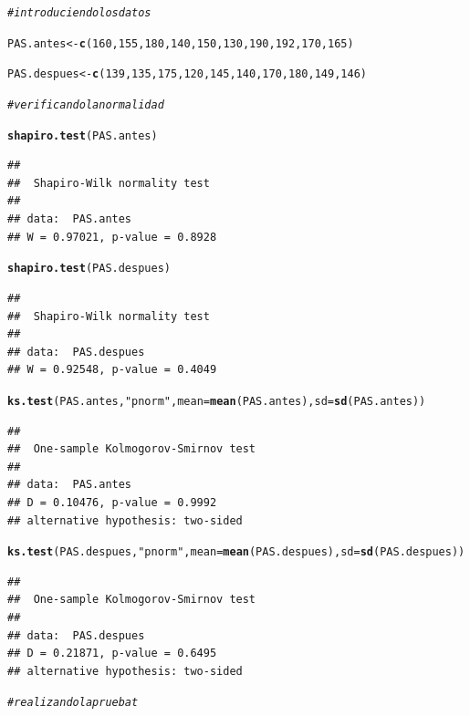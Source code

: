 \documentclass[12pt,letterpaper]{article}\usepackage[]{graphicx}\usepackage[]{color}
\makeatletter
\newcommand{\hlnum}[1]{\textcolor[rgb]{0.686,0.059,0.569}{#1}}%
\newcommand{\hlstr}[1]{\textcolor[rgb]{0.192,0.494,0.8}{#1}}%
\newcommand{\hlcom}[1]{\textcolor[rgb]{0.678,0.584,0.686}{\textit{#1}}}%
\newcommand{\hlstd}[1]{\textcolor[rgb]{0.345,0.345,0.345}{#1}}%
\newcommand{\hlkwb}[1]{\textcolor[rgb]{0.69,0.353,0.396}{#1}}%
\newcommand{\hlkwc}[1]{\textcolor[rgb]{0.333,0.667,0.333}{#1}}%
\newcommand{\hlkwd}[1]{\textcolor[rgb]{0.737,0.353,0.396}{\textbf{#1}}}%
\newenvironment{kframe}{%
 \def\at@end@of@kframe{}%
 \ifinner\ifhmode%
  \def\at@end@of@kframe{\end{minipage}}%
  \begin{minipage}{\columnwidth}%
 \fi\fi%
 \def\FrameCommand##1{\hskip\@totalleftmargin \hskip-\fboxsep
 \colorbox{shadecolor}{##1}\hskip-\fboxsep
     \hskip-\linewidth \hskip-\@totalleftmargin \hskip\columnwidth}%
 \MakeFramed {\advance\hsize-\width
   \@totalleftmargin\z@ \linewidth\hsize
   \@setminipage}}%
 {\par\unskip\endMakeFramed%
 \at@end@of@kframe}
\newenvironment{knitrout}{}{} %
\makeatother
\begin{document}
\begin{knitrout}
\color{fgcolor}\begin{kframe}
\begin{alltt}
\hlcom{#introduciendo los datos }

\hlstd{PAS.antes} \hlkwb{<-} \hlkwd{c}\hlstd{(}\hlnum{160}\hlstd{,} \hlnum{155}\hlstd{,} \hlnum{180}\hlstd{,} \hlnum{140}\hlstd{,} \hlnum{150}\hlstd{,} \hlnum{130}\hlstd{,} \hlnum{190}\hlstd{,} \hlnum{192}\hlstd{,} \hlnum{170}\hlstd{,} \hlnum{165}\hlstd{)}

\hlstd{PAS.despues} \hlkwb{<-} \hlkwd{c}\hlstd{(}\hlnum{139}\hlstd{,} \hlnum{135}\hlstd{,} \hlnum{175}\hlstd{,} \hlnum{120}\hlstd{,} \hlnum{145}\hlstd{,} \hlnum{140}\hlstd{,} \hlnum{170}\hlstd{,} \hlnum{180}\hlstd{,} \hlnum{149}\hlstd{,} \hlnum{146}\hlstd{)}

\hlcom{#verificando la normalidad }

\hlkwd{shapiro.test}\hlstd{(PAS.antes)}
\end{alltt}
\begin{verbatim}
## 
## 	Shapiro-Wilk normality test
## 
## data:  PAS.antes
## W = 0.97021, p-value = 0.8928
\end{verbatim}
\begin{alltt}
\hlkwd{shapiro.test}\hlstd{(PAS.despues)}
\end{alltt}
\begin{verbatim}
## 
## 	Shapiro-Wilk normality test
## 
## data:  PAS.despues
## W = 0.92548, p-value = 0.4049
\end{verbatim}
\begin{alltt}
\hlkwd{ks.test}\hlstd{(PAS.antes,}\hlstr{"pnorm"}\hlstd{,}\hlkwc{mean}\hlstd{=}\hlkwd{mean}\hlstd{(PAS.antes),}\hlkwc{sd}\hlstd{=}\hlkwd{sd}\hlstd{(PAS.antes))}
\end{alltt}
\begin{verbatim}
## 
## 	One-sample Kolmogorov-Smirnov test
## 
## data:  PAS.antes
## D = 0.10476, p-value = 0.9992
## alternative hypothesis: two-sided
\end{verbatim}
\begin{alltt}
\hlkwd{ks.test}\hlstd{(PAS.despues,}\hlstr{"pnorm"}\hlstd{,}\hlkwc{mean}\hlstd{=}\hlkwd{mean}\hlstd{(PAS.despues),}\hlkwc{sd}\hlstd{=}\hlkwd{sd}\hlstd{(PAS.despues))}
\end{alltt}
\begin{verbatim}
## 
## 	One-sample Kolmogorov-Smirnov test
## 
## data:  PAS.despues
## D = 0.21871, p-value = 0.6495
## alternative hypothesis: two-sided
\end{verbatim}
\begin{alltt}
\hlcom{#realizando la prueba t }


\end{alltt}
\end{kframe}
\end{knitrout}
\end{document}
